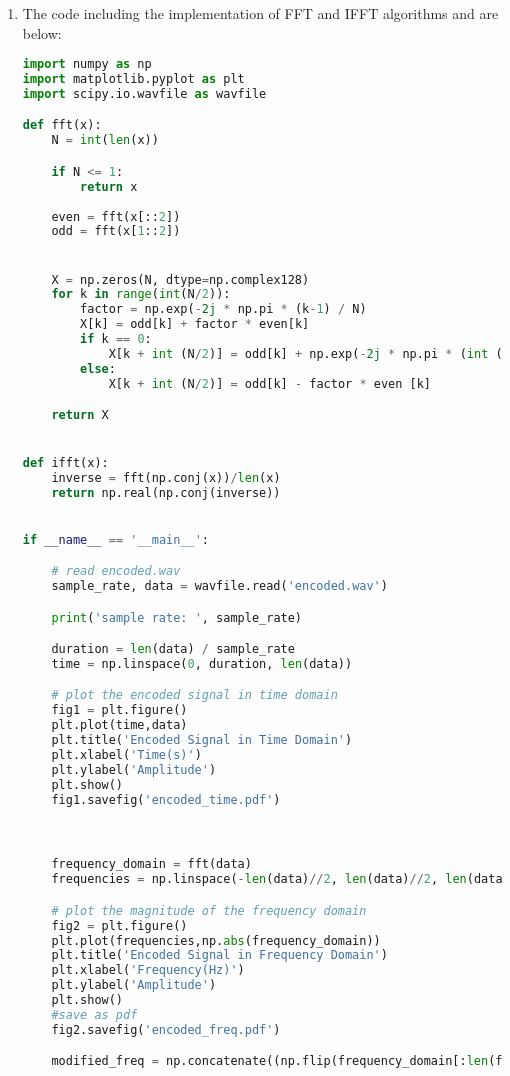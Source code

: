 \documentclass[10pt,a4paper, margin=1in]{article}
\begin{document}
\begin{enumerate}
\item %
The code including the implementation of FFT and IFFT algorithms and are below:

\begin{lstlisting}[language=Python, caption=Message decoder that uses FFT\&IFFT implementaton ]
import numpy as np
import matplotlib.pyplot as plt
import scipy.io.wavfile as wavfile

def fft(x):
    N = int(len(x))

    if N <= 1:
        return x
    
    even = fft(x[::2])
    odd = fft(x[1::2])


    X = np.zeros(N, dtype=np.complex128)
    for k in range(int(N/2)):
        factor = np.exp(-2j * np.pi * (k-1) / N)
        X[k] = odd[k] + factor * even[k]
        if k == 0:
            X[k + int (N/2)] = odd[k] + np.exp(-2j * np.pi * (int (N/2) -1) / N) * even [k]
        else:    
            X[k + int (N/2)] = odd[k] - factor * even [k]

    return X


def ifft(x):
    inverse = fft(np.conj(x))/len(x)
    return np.real(np.conj(inverse))
    

if __name__ == '__main__':

    # read encoded.wav
    sample_rate, data = wavfile.read('encoded.wav')

    print('sample rate: ', sample_rate)

    duration = len(data) / sample_rate
    time = np.linspace(0, duration, len(data))

    # plot the encoded signal in time domain
    fig1 = plt.figure()
    plt.plot(time,data)
    plt.title('Encoded Signal in Time Domain')
    plt.xlabel('Time(s)')
    plt.ylabel('Amplitude')
    plt.show()
    fig1.savefig('encoded_time.pdf')



    frequency_domain = fft(data)
    frequencies = np.linspace(-len(data)//2, len(data)//2, len(data))

    # plot the magnitude of the frequency domain
    fig2 = plt.figure()
    plt.plot(frequencies,np.abs(frequency_domain))
    plt.title('Encoded Signal in Frequency Domain')
    plt.xlabel('Frequency(Hz)')
    plt.ylabel('Amplitude')
    plt.show()
    #save as pdf
    fig2.savefig('encoded_freq.pdf')

    modified_freq = np.concatenate((np.flip(frequency_domain[:len(frequency_domain)//2]), np.flip(frequency_domain[len(frequency_domain)//2:]))) #solves the secret


\end{lstlisting}
\end{enumerate}
\end{document}
